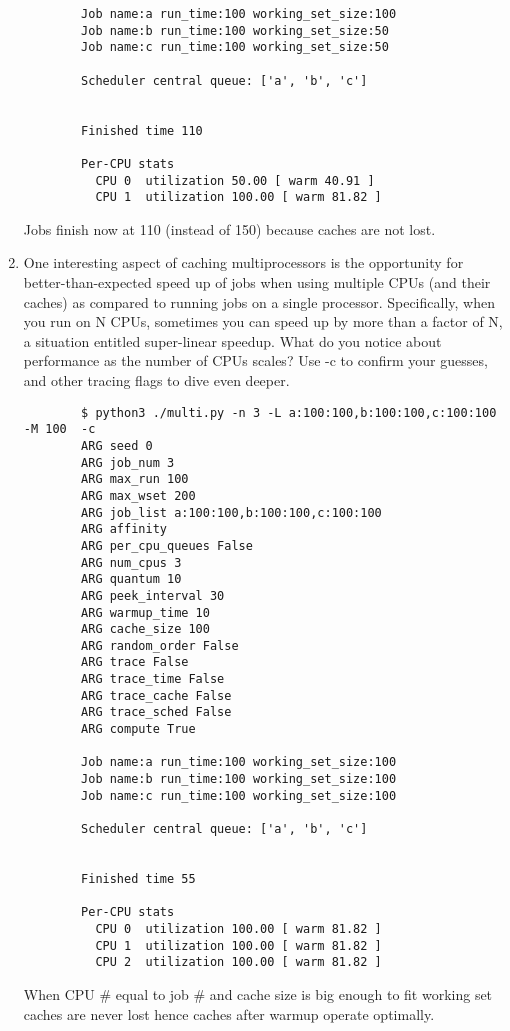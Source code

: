 \documentclass{article}
\begin{document}
\begin{enumerate}[label=\textbf{\arabic*}), start=5]
{\begin{verbatim}
        Job name:a run_time:100 working_set_size:100
        Job name:b run_time:100 working_set_size:50
        Job name:c run_time:100 working_set_size:50
        
        Scheduler central queue: ['a', 'b', 'c']
        
        
        Finished time 110
        
        Per-CPU stats
          CPU 0  utilization 50.00 [ warm 40.91 ]
          CPU 1  utilization 100.00 [ warm 81.82 ]
    \end{verbatim}
    }
    Jobs finish now at 110 (instead of 150) because caches are not
    lost.
\newpage
    \item One interesting aspect of caching multiprocessors is
    the opportunity for better-than-expected speed up of jobs
    when using multiple CPUs (and their caches) as compared to
    running jobs on a single processor. Specifically, when you
    run on N CPUs, sometimes you can speed up by more than
    a factor of N, a situation entitled super-linear speedup.
    What do you notice about performance as the number of CPUs
    scales? Use -c to confirm your guesses, and other tracing
    flags to dive even deeper.
    {\scriptsize
    \begin{verbatim}
        $ python3 ./multi.py -n 3 -L a:100:100,b:100:100,c:100:100 -M 100  -c
        ARG seed 0
        ARG job_num 3
        ARG max_run 100
        ARG max_wset 200
        ARG job_list a:100:100,b:100:100,c:100:100
        ARG affinity 
        ARG per_cpu_queues False
        ARG num_cpus 3
        ARG quantum 10
        ARG peek_interval 30
        ARG warmup_time 10
        ARG cache_size 100
        ARG random_order False
        ARG trace False
        ARG trace_time False
        ARG trace_cache False
        ARG trace_sched False
        ARG compute True
        
        Job name:a run_time:100 working_set_size:100
        Job name:b run_time:100 working_set_size:100
        Job name:c run_time:100 working_set_size:100
        
        Scheduler central queue: ['a', 'b', 'c']
        
        
        Finished time 55
        
        Per-CPU stats
          CPU 0  utilization 100.00 [ warm 81.82 ]
          CPU 1  utilization 100.00 [ warm 81.82 ]
          CPU 2  utilization 100.00 [ warm 81.82 ]
    \end{verbatim}
    }
    When CPU \# equal to job \# and cache size is big enough to fit
    working set caches are never lost hence caches after warmup
    operate optimally.
\end{enumerate}

\newpage


\end{document}
